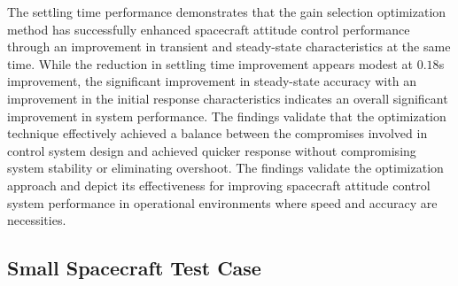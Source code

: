 \documentclass{ifacconf}
\begin{document}
The settling time performance demonstrates that the gain selection optimization method has successfully enhanced spacecraft attitude control performance through an improvement in transient and steady-state characteristics at the same time. While the reduction in settling time improvement appears modest at $0.18$s improvement, the significant improvement in steady-state accuracy with an improvement in the initial response characteristics indicates an overall significant improvement in system performance. The findings validate that the optimization technique effectively achieved a balance between the compromises involved in control system design and achieved quicker response without compromising system stability or eliminating overshoot. The findings validate the optimization approach and depict its effectiveness for improving spacecraft attitude control system performance in operational environments where speed and accuracy are necessities.






\subsection{Small Spacecraft Test Case}
\end{document}
